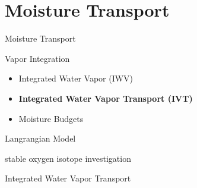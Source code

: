 \section{Moisture Transport}

\begin{frame}{Moisture Transport}

\begin{enumerate}
  \item Vapor Integration
    \begin{itemize}
      \item Integrated Water Vapor (IWV) \cite{gimeno_atmospheric_2014, eiras-barca_seasonal_2016, bao_interpretation_2006, ma_atmospheric_nodate}
      \item \textbf{Integrated Water Vapor Transport (IVT)} \cite{zhu_proposed_1998, sousa_north_2020, jiang_impact_2017, ayantobo_integrated_2022, allan_diagnosing_2016, ralph_dropsonde_2017, ralph_scale_2019}
      \item Moisture Budgets \cite{seager_mechanisms_2020, yang_moisture_2022}
    \end{itemize}
    {\footnotesize
  \item Langrangian Model \cite{ramos_atmospheric_2016, ma_atmospheric_nodate}
    \item stable oxygen isotope investigation \cite{ma_atmospheric_nodate, tian_relation_2001}
    }
\end{enumerate}
  
\end{frame}

\begin{frame}{Integrated Water Vapor Transport}

  
  
\end{frame}

